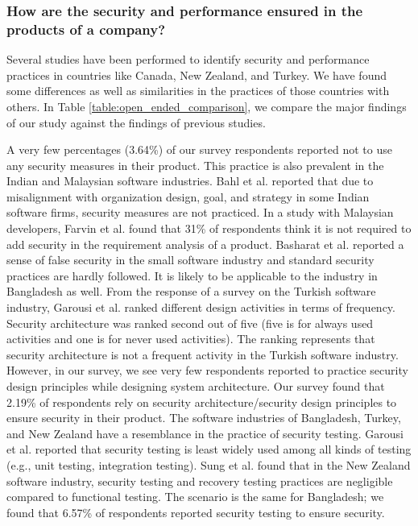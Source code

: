 \subsubsection{How are the security and performance ensured in the products of a company?}

Several studies have been performed to identify security and performance practices in countries like Canada, New Zealand, and Turkey. We have found some differences as well as similarities in the practices of those countries with others. In Table \ref{table:open_ended_comparison}, we compare the major findings of our study against the findings of previous studies.


\label{security_comparison}
A very few percentages (3.64\%) of our survey respondents reported not to use any security measures in their product. This practice is also prevalent in the Indian and Malaysian software industries. Bahl et al.\citep{Bahl2011} reported that due to misalignment with organization design, goal, and strategy in some Indian software firms, security measures are not practiced. In a study with Malaysian developers, Farvin et al.\citep{Farvin2016} found that 31\% of respondents think it is not required to add security in the requirement analysis of a product. Basharat et al.\citep{Basharat2013} reported a sense of false security in the small software industry and standard security practices are hardly followed. It is likely to be applicable to the industry in Bangladesh as well. From the response of a survey on the Turkish software industry, Garousi et al.\citep{Garousi2015} ranked different design activities in terms of frequency. Security architecture was ranked second out of five (five is for always used activities and one is for never used activities). The ranking represents that security architecture is not a frequent activity in the Turkish software industry. However, in our survey, we see very few respondents reported to practice security design principles while designing system architecture. Our survey found that 2.19\% of respondents rely on security architecture/security design principles to ensure security in their product. The software industries of Bangladesh, Turkey, and New Zealand have a resemblance in the practice of security testing. Garousi et al.\citep{Garousi2015} reported that security testing is least widely used among all kinds of testing (e.g., unit testing, integration testing). Sung et al.\citep{Sung2006} found that in the New Zealand software industry, security testing and recovery testing practices are negligible compared to functional testing. The scenario is the same for Bangladesh; we found that 6.57\% of respondents reported security testing to ensure security.


